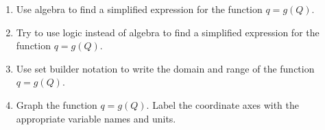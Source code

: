 \documentclass{ximera}
\begin{document}
\begin{question}
\begin{enumerate}
\begin{enumerate}
\begin{enumerate}
\item Use algebra to find a simplified expression for the function $q=g(Q)$.

\item Try to use logic instead of algebra to find a simplified expression for the function $q=g(Q)$.

\item Use set builder notation to write the domain and range of the function $q=g(Q)$.

\item Graph the function $q=g(Q)$. Label the coordinate axes with the appropriate variable names and units.
\end{enumerate}
\end{enumerate}
\end{enumerate}

\end{question}
\end{document}
